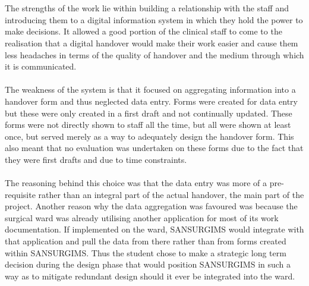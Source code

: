 \\ \\ 
The strengths of the work lie within building a relationship with the staff and introducing them to a digital information system in which they hold the power to make decisions. It allowed a good portion of the clinical staff to come to the realisation that a digital handover would make their work easier and cause them less headaches in terms of the quality of handover and the medium through which it is communicated. 
\\ \\
The weakness of the system is that it focused on aggregating information into a handover form and thus neglected data entry. Forms were created for data entry but these were only created in a first draft and not continually updated. These forms were not directly shown to staff all the time, but all were shown at least once, but served merely as a way to adequately design the handover form. This also meant that no evaluation was undertaken on these forms due to the fact that they were first drafts and due to time constraints. 
\\ \\
The reasoning behind this choice was that the data entry was more of a pre-requisite rather than an integral part of the actual handover, the main part of the project. Another reason why the data aggregation was favoured was because the surgical ward was already utilising another application for most of its work documentation. If implemented on the ward, SANSURGIMS would integrate with that application and pull the data from there rather than from forms created within SANSURGIMS. Thus the student chose to make a strategic long term decision during the design phase that would position SANSURGIMS in such a way as to mitigate redundant design should it ever be integrated into the ward.
